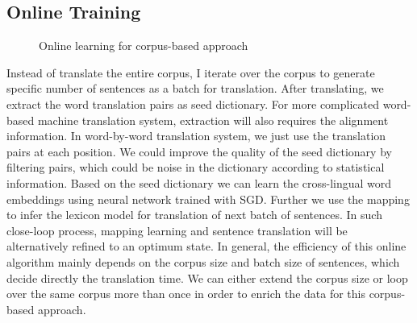 \subsection{Online Training}

\begin{figure}[H]
	\centering
	\begin{minipage}{.7\linewidth}
		\begin{algorithm}[H]
			\SetAlgoLined
			\caption{Online learning for corpus-based approach}
		\end{algorithm}
	\end{minipage}
\end{figure}
Instead of translate the entire corpus, I iterate over the corpus to generate specific number of sentences as a batch for translation. After translating, we extract the word translation pairs as seed dictionary. For more complicated word-based machine translation system, extraction will also requires the alignment information. In word-by-word translation system, we just use the translation pairs at each position. We could improve the quality of the seed dictionary by filtering pairs, which could be noise in the dictionary according to statistical information. Based on the seed dictionary we can learn the cross-lingual word embeddings using neural network trained with SGD. Further we use the mapping to infer the lexicon model for translation of next batch of sentences. In such close-loop process, mapping learning and sentence translation will be alternatively refined to an optimum state. In general, the efficiency of this online algorithm mainly depends on the corpus size and batch size of sentences, which decide directly the translation time. We can either extend the corpus size or loop over the same corpus more than once in order to enrich the data for this corpus-based approach.



